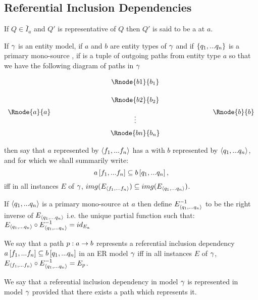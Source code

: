\subsection{Referential Inclusion Dependencies}
\begin{definition}
If $Q \in \bar{I}_a$ and $Q'$ is representative of $Q$ then $Q'$ is said to be
a  at $a$. 
\end{definition}


\begin{definition}
If $\gamma$ is an entity model, 
if $a$ and $b$ are entity types of  $\gamma$ and  if $\left\{q_1,...q_n\right\}$
is a primary mono-source ,
if \fntuple is a tuple of outgoing paths from entity type $a$  
so that we have the following diagram of paths in $\gamma$
\setlength{\arraycolsep}{.2cm}
\begin{center}
$
\begin{array}{cp{2cm}ccp{2cm}c}
             & &         & \Rnode{b1}{b_1} &&               \\ [0.5cm]
						 & &         & \Rnode{b2}{b_2} &&               \\ [0.2cm]
\Rnode{a}{a} & &         &                 &&  \Rnode{b}{b} \\ [-0.2cm]						
             & &         &    \vdots       &&               \\ [0.2cm]
             & &         & \Rnode{bn}{b_n} &&               \\ 
\end{array}
$
\end{center}
then say that $a$ represented by $\langle f_1,...f_n\rangle$ 
has a  with $b$ represented by $\langle q_1,...q_n\rangle$, and for which we shall summarily write:
$$
a\left[f_1,...f_n\right]\subseteq b\left[q_1,...q_n\right],
$$
iff in all instances $E$ of $\gamma$,
$img(E_{\langle f_1,...f_n\rangle}) \subseteq img(E_{\langle q_1,...q_n\rangle})$. 
\end{definition}

If $\langle q_1,...q_n\rangle$ is a primary mono-source at $a$ then define $E_{\langle q_1,...q_n\rangle}^{-1}$ to be the right inverse of
$E_{\langle q_1,...q_n\rangle}$ i.e. the unique partial function such that:
$E_{\langle q_1,...q_n\rangle} \circ E_{\langle q_1,...q_n\rangle}^{-1} = id_{E_a}$

\begin{definition}
We say that a path $p:a \rightarrow b$ represents a referential inclusion dependency
$a\left[f_1,...f_n\right]\subseteq b\left[q_1,...q_n\right]$  in an ER model $\gamma$ iff
  in all instances $E$ of $\gamma$, $E_{\langle f_1,...f_n\rangle} \circ E_{\langle q_1,...q_n\rangle}^{-1}=E_p$.
\end{definition}
We say that a referential inclusion dependency in model $\gamma$ is represented in model $\gamma$ provided that
there exists a path which represents it. 

